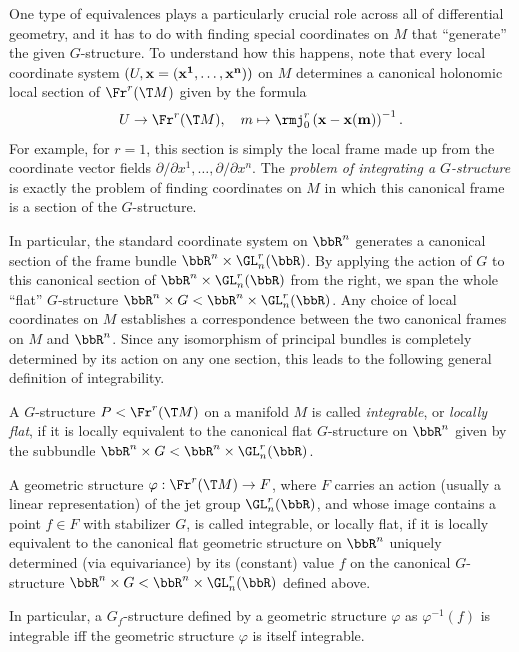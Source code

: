 One type of equivalences plays a particularly crucial role across all of differential geometry, and it has to do with finding special coordinates on $M$ that ``generate'' the given $G$-structure. To understand how this happens, note that every local coordinate system $(U,\bf{x}=(x^1,\ldots,x^n))$ on $M$ determines a canonical holonomic local section of $\Fr^r(\T M)$ given by the formula 
\[U\to \Fr^r(\T M),\quad m\mapsto \rmj^r_0\left(\bf{x}-\bf{x}(m)\right)^{-1}.\]
For example, for $r=1$, this section is simply the local frame made up from the coordinate vector fields $\partial/\partial x^1,\ldots,\partial/\partial x^n$. The \emph{problem of integrating a $G$-structure} is exactly the problem of finding coordinates on $M$ in which this canonical frame is a section of the $G$-structure. 

In particular, the standard coordinate system on $\bbR^n$ generates a canonical section of the frame bundle $\bbR^n\times \GL_n^r(\bbR)$. By applying the action of $G$ to this canonical section of $\bbR^n\times \GL_n^r(\bbR)$ from the right, we span the whole ``flat'' $G$-structure $\bbR^n\times G<\bbR^n\times \GL_n^r(\bbR)$. Any choice of local coordinates on $M$ establishes a correspondence between the two canonical frames on $M$ and $\bbR^n$.  Since any isomorphism of principal bundles is completely determined by its action on any one section, this leads to the following general definition of integrability.

\begin{defn}
    A $G$-structure $P<\Fr^r(\T M)$ on a manifold $M$ is called \emph{integrable}, or \emph{locally flat}, if it is locally equivalent to the canonical flat $G$-structure on $\bbR^n$ given by the subbundle $\bbR^n\times G < \bbR^n\times\GL_n^r(\bbR)$. 

    A geometric structure $\varphi:\Fr^r(\T M)\to F$, where $F$ carries an action (usually a linear representation) of the jet group $\GL_n^r(\bbR)$, and whose image contains a point $f\in F$ with stabilizer $G$, is called integrable, or locally flat, if it is locally equivalent to the canonical flat geometric structure on $\bbR^n$ uniquely determined (via equivariance) by its (constant) value $f$ on the canonical $G$-structure $\bbR^n\times G < \bbR^n\times\GL_n^r(\bbR)$ defined above. 
\end{defn}

In particular, a $G_f$-structure defined by a geometric structure $\varphi$ as $\varphi^{-1}(f)$ is integrable iff the geometric structure $\varphi$ is itself integrable.

